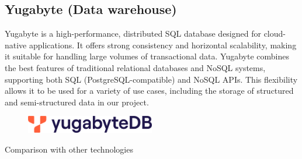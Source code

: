 \documentclass[12pt,a4paper]{article}
\begin{document}
\subsection{Yugabyte (Data warehouse)}
Yugabyte is a high-performance, distributed SQL database designed for
cloud-native applications. It offers strong consistency and horizontal
scalability, making it suitable for handling large volumes of transactional
data. Yugabyte combines the best features of traditional relational databases
and NoSQL systems, supporting both SQL (PostgreSQL-compatible) and NoSQL APIs.
This flexibility allows it to be used for a variety of use cases, including the
storage of structured and semi-structured data in our project.
\begin{figure}[H]
    \begin{center}
        \includegraphics[width=0.5\textwidth]{Images/yugabyte.png}
    \end{center}
\end{figure}
Comparison with other technologies
\end{document}
